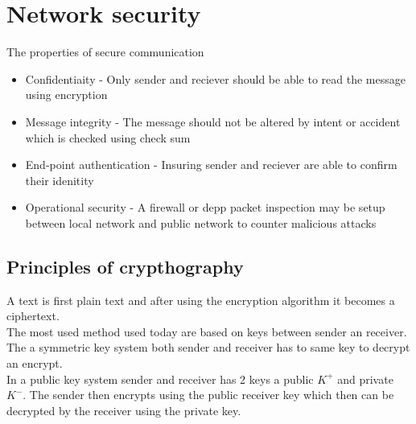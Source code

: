 \documentclass[12pt, a4paper]{article}
\begin{document}
	\section{Network security}
		The properties of secure communication
		\begin{itemize}
			\item Confidentiaity - Only sender and reciever should be able to read the message using encryption
			\item Message integrity - The message should not be altered by intent or accident which is checked using check sum
			\item End-point authentication - Insuring sender and reciever are able to confirm their idenitity
			\item Operational security - A firewall or depp packet inspection may be setup between local network and public network to counter malicious attacks
		\end{itemize}
		\subsection{Principles of crypthography}
			A text is first plain text and after using the encryption algorithm it becomes a ciphertext.\\
			The most used method used today are based on keys between sender an receiver.\\
			The a symmetric key system both sender and receiver has to same key to decrypt an encrypt.\\
			In a public key system sender and receiver has 2 keys a public $K^+$ and private $K^-$. The sender then encrypts using the public receiver key which then can be decrypted by the receiver using the private key.\\
\end{document}
